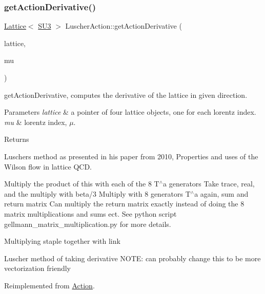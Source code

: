 \subsubsection{\texorpdfstring{getActionDerivative()}{getActionDerivative()}}
{\footnotesize\ttfamily \mbox{\hyperlink{class_lattice}{Lattice}}$<$ \mbox{\hyperlink{class_s_u3}{S\+U3}} $>$ Luscher\+Action\+::get\+Action\+Derivative (\begin{DoxyParamCaption}\item[{\mbox{\hyperlink{class_lattice}{Lattice}}$<$ \mbox{\hyperlink{class_s_u3}{S\+U3}} $>$ $\ast$}]{lattice,  }\item[{int}]{mu }\end{DoxyParamCaption})\hspace{0.3cm}{\ttfamily [virtual]}}



get\+Action\+Derivative, computes the derivative of the lattice in given direction. 


\begin{DoxyParams}{Parameters}
{\em lattice} & a pointer of four lattice objects, one for each lorentz index. \\
\hline
{\em mu} & lorentz index, $\mu$. \\
\hline
\end{DoxyParams}
\begin{DoxyReturn}{Returns}

\end{DoxyReturn}
Luschers method as presented in his paper from 2010, Properties and uses of the Wilson flow in lattice Q\+CD.

Multiply the product of this with each of the 8 T$^\wedge$a generators Take trace, real, and the multiply with beta/3 Multiply with 8 generators T$^\wedge$a again, sum and return matrix Can multiply the return matrix exactly instead of doing the 8 matrix multiplications and sums ect. See python script gellmann\+\_\+matrix\+\_\+multiplication.\+py for more details.

Multiplying staple together with link

Luscher method of taking derivative N\+O\+TE\+: can probably change this to be more vectorization friendly 

Reimplemented from \mbox{\hyperlink{class_action_a78168dd7c3819a3365e28fc1aae1b9b6}{Action}}.

